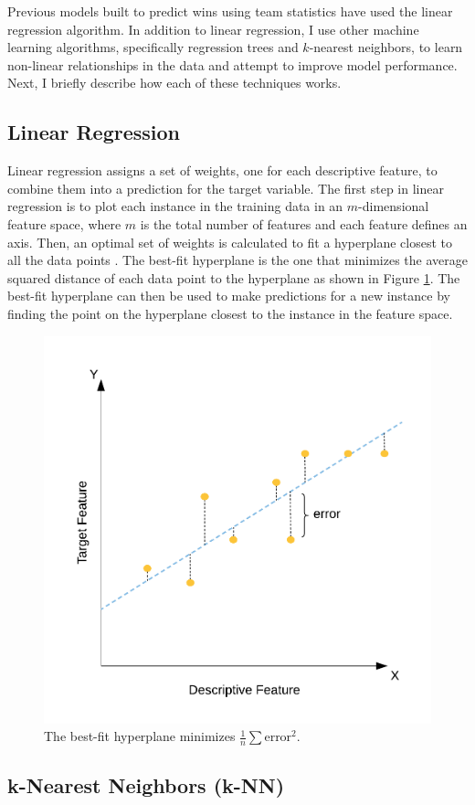 \documentclass[pageno]{jpaper}
\begin{document}
Previous models built to predict wins using team statistics have used the linear regression algorithm. In addition to linear regression, I use other machine learning algorithms, specifically regression trees and $k$-nearest neighbors, to learn non-linear relationships in the data and attempt to improve model performance. Next, I briefly describe how each of these techniques works.

\subsection{Linear Regression}

Linear regression assigns a set of weights, one for each descriptive feature, to combine them into a prediction for the target variable. The first step in linear regression is to plot each instance in the training data in an $m$-dimensional feature space, where $m$ is the total number of features and each feature defines an axis. Then, an optimal set of weights is calculated to fit a hyperplane closest to all the data points \cite{regtechniques}. The best-fit hyperplane is the one that minimizes the average squared distance of each data point to the hyperplane as shown in Figure \ref{fig:linreg}. The best-fit hyperplane can then be used to make predictions for a new instance by finding the point on the hyperplane closest to the instance in the feature space.

\begin{figure}[hbt]
\centering
\includegraphics[width=0.5\linewidth]{linreg.png}
\caption{The best-fit hyperplane minimizes $\frac{1}{n}\sum\text{error}^2$.}
\label{fig:linreg}
\end{figure}

\subsection{k-Nearest Neighbors (k-NN)}
\end{document}
